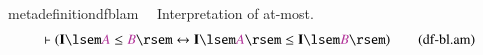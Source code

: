 \begin{restatable}{metadefinition}{dfblam}~~ Interpretation of at-most.
\begin{align}
\vdash ( \mathbf{I} \lsem \mc{A} \le \mc{B} \rsem \leftrightarrow \mathbf{I}
    \lsem \mc{A} \rsem \le \mathbf{I} \lsem \mc{B} \rsem
    )\label{eq:df-bl.am}\tag{df-bl.am}
\end{align}
\end{restatable}

